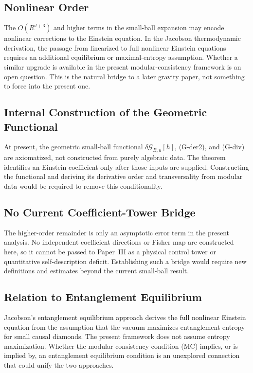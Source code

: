 \documentclass[12pt]{article}
\theoremstyle{definition}
\theoremstyle{remark}
\begin{document}
\subsection{Nonlinear Order}\label{subsec:8.2}

The \(O(R^{d+3})\) and higher terms in the small-ball expansion may encode nonlinear corrections to the Einstein equation. In the Jacobson\cite{Jacobson2016} thermodynamic derivation, the passage from linearized to full nonlinear Einstein equations requires an additional equilibrium or maximal-entropy assumption. Whether a similar upgrade is available in the present modular-consistency framework is an open question. This is the natural bridge to a later gravity paper, not something to force into the present one.

\subsection{Internal Construction of the Geometric Functional}\label{subsec:8.3}

At present, the geometric small-ball functional
\(\delta\mathcal{G}_{B,u}[h]\), (G-der2), and (G-div) are axiomatized,
not constructed from purely algebraic data. The theorem identifies an
Einstein coefficient only after those inputs are supplied. Constructing
the functional and deriving its derivative order and transversality from
modular data would be required to remove this conditionality.

\subsection{No Current Coefficient-Tower Bridge}\label{subsec:8.4}

The higher-order remainder is only an asymptotic error term in the
present analysis. No independent coefficient directions or Fisher map
are constructed here, so it cannot be passed to Paper~III as a physical
control tower or quantitative self-description deficit. Establishing
such a bridge would require new definitions and estimates beyond the
current small-ball result.

\subsection{Relation to Entanglement Equilibrium}\label{subsec:8.5}

Jacobson's\cite{Jacobson2016} entanglement equilibrium approach derives the full nonlinear Einstein equation from the assumption that the vacuum maximizes entanglement entropy for small causal diamonds. The present framework does not assume entropy maximization. Whether the modular consistency condition (MC) implies, or is implied by, an entanglement equilibrium condition is an unexplored connection that could unify the two approaches.
 
\end{document}
